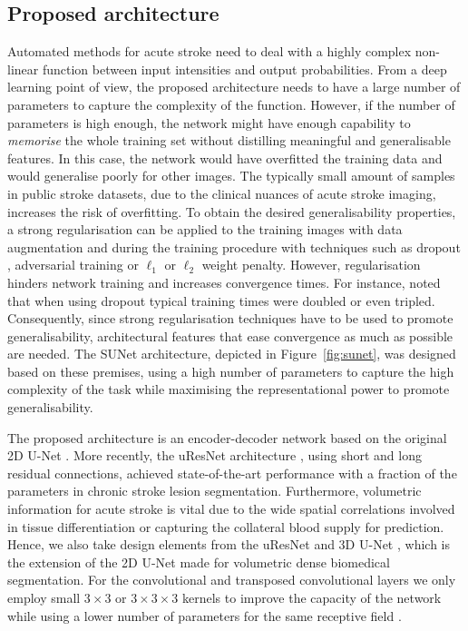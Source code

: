 \documentclass[letterpaper,final,authoryear,3p,times,twocolumn]{elsarticle}
\begin{document}
\subsection{Proposed architecture}
Automated methods for acute stroke need to deal with a highly complex non-linear function between input intensities and output probabilities. From a deep learning point of view, the proposed architecture needs to have a large number of parameters to capture the complexity of the function. However, if the number of parameters is high enough, the network might have enough capability to \textit{memorise} the whole training set without distilling meaningful and generalisable features. In this case, the network would have overfitted the training data and would generalise poorly for other images. The typically small amount of samples in public stroke datasets, due to the clinical nuances of acute stroke imaging, increases the risk of overfitting. To obtain the desired generalisability properties, a strong regularisation can be applied to the training images with data augmentation and during the training procedure with techniques such as dropout \citep{Srivastava2014}, adversarial training \citep{Goodfellow2014} or $\ell_1$ or $\ell_2$ weight penalty. However, regularisation hinders network training and increases convergence times. For instance, \cite{Srivastava2014} noted that when using dropout typical training times were doubled or even tripled. Consequently, since strong regularisation techniques have to be used to promote generalisability, architectural features that ease convergence as much as possible are needed. The SUNet architecture, depicted in Figure~\ref{fig:sunet}, was designed based on these premises, using a high number of parameters to capture the high complexity of the task while maximising the representational power to promote generalisability. 

The proposed architecture is an encoder-decoder network based on the original 2D U-Net  \citep{Ronneberger2015}. More recently, the uResNet architecture \citep{Guerrero2018uresnet}, using short and long residual connections, achieved state-of-the-art performance with a fraction of the parameters in chronic stroke lesion segmentation. Furthermore, volumetric information for acute stroke is vital due to the wide spatial correlations involved in tissue differentiation or capturing the collateral blood supply for prediction. Hence, we also take design elements from the uResNet and 3D U-Net \citep{Cicek2016}, which is the extension of the 2D U-Net made for volumetric dense biomedical segmentation. For the convolutional and transposed convolutional layers we only employ small $3\times3$ or $3\times3\times3$ kernels to improve the capacity of the network while using a lower number of parameters for the same receptive field \citep{Simonyan2014}. 
\end{document}
